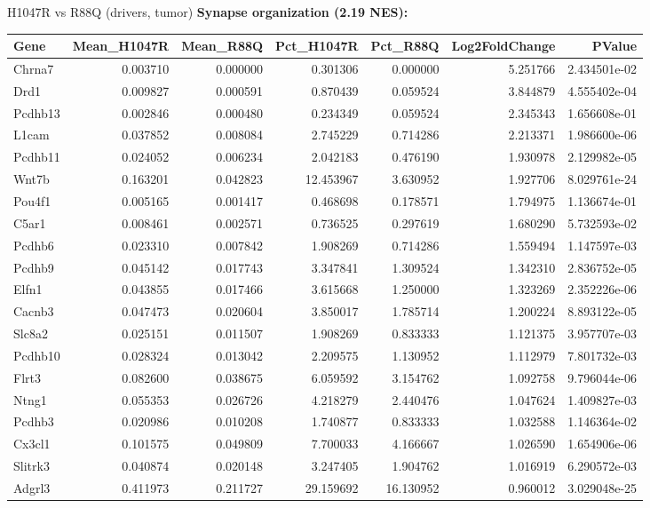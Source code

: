 \documentclass[10pt, aspectratio=169]{beamer}
\begin{document}
\begin{frame}{H1047R vs R88Q (drivers, tumor)}
  \centering
  {\small \textbf{Synapse organization (2.19 NES):}}\par
  \vspace{0.15cm}
  \tiny
  \begin{tabular}{l r r r r r r}
    \toprule
    \textbf{Gene} & \textbf{Mean\_H1047R} & \textbf{Mean\_R88Q} & \textbf{Pct\_H1047R} & \textbf{Pct\_R88Q} & \textbf{Log2FoldChange} & \textbf{PValue} \\
    \midrule
    Chrna7 & 0.003710 & 0.000000 & 0.301306 & 0.000000 & 5.251766 & 2.434501e-02 \\
    Drd1 & 0.009827 & 0.000591 & 0.870439 & 0.059524 & 3.844879 & 4.555402e-04 \\
    Pcdhb13 & 0.002846 & 0.000480 & 0.234349 & 0.059524 & 2.345343 & 1.656608e-01 \\
    L1cam & 0.037852 & 0.008084 & 2.745229 & 0.714286 & 2.213371 & 1.986600e-06 \\
    Pcdhb11 & 0.024052 & 0.006234 & 2.042183 & 0.476190 & 1.930978 & 2.129982e-05 \\
    Wnt7b & 0.163201 & 0.042823 & 12.453967 & 3.630952 & 1.927706 & 8.029761e-24 \\
    Pou4f1 & 0.005165 & 0.001417 & 0.468698 & 0.178571 & 1.794975 & 1.136674e-01 \\
    C5ar1 & 0.008461 & 0.002571 & 0.736525 & 0.297619 & 1.680290 & 5.732593e-02 \\
    Pcdhb6 & 0.023310 & 0.007842 & 1.908269 & 0.714286 & 1.559494 & 1.147597e-03 \\
    Pcdhb9 & 0.045142 & 0.017743 & 3.347841 & 1.309524 & 1.342310 & 2.836752e-05 \\
    Elfn1 & 0.043855 & 0.017466 & 3.615668 & 1.250000 & 1.323269 & 2.352226e-06 \\
    Cacnb3 & 0.047473 & 0.020604 & 3.850017 & 1.785714 & 1.200224 & 8.893122e-05 \\
    Slc8a2 & 0.025151 & 0.011507 & 1.908269 & 0.833333 & 1.121375 & 3.957707e-03 \\
    Pcdhb10 & 0.028324 & 0.013042 & 2.209575 & 1.130952 & 1.112979 & 7.801732e-03 \\
    Flrt3 & 0.082600 & 0.038675 & 6.059592 & 3.154762 & 1.092758 & 9.796044e-06 \\
    Ntng1 & 0.055353 & 0.026726 & 4.218279 & 2.440476 & 1.047624 & 1.409827e-03 \\
    Pcdhb3 & 0.020986 & 0.010208 & 1.740877 & 0.833333 & 1.032588 & 1.146364e-02 \\
    Cx3cl1 & 0.101575 & 0.049809 & 7.700033 & 4.166667 & 1.026590 & 1.654906e-06 \\
    Slitrk3 & 0.040874 & 0.020148 & 3.247405 & 1.904762 & 1.016919 & 6.290572e-03 \\
    Adgrl3 & 0.411973 & 0.211727 & 29.159692 & 16.130952 & 0.960012 & 3.029048e-25 \\
    \bottomrule
  \end{tabular}
\end{frame}
\end{document}

